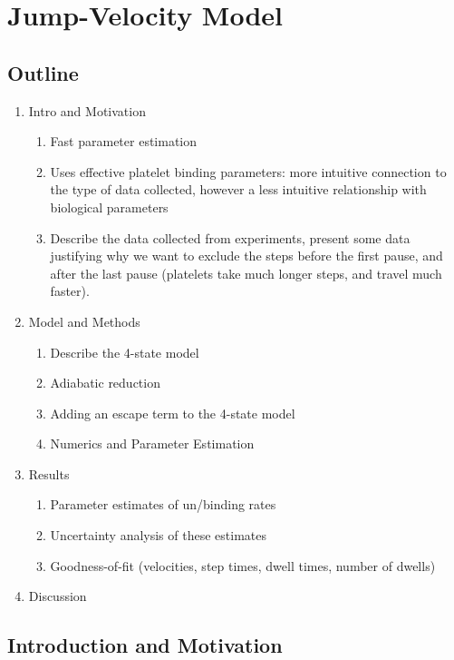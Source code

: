 
\chapter{Jump-Velocity Model}
\label{cha:jump-velocity-model}

\setcounter{section}{-1}
\section{Outline}
\label{sec:outline}

\begin{enumerate}
\item Intro and Motivation
  \begin{enumerate}
  \item Fast parameter estimation
  \item Uses effective platelet binding parameters: more intuitive
    connection to the type of data collected, however a less intuitive
    relationship with biological parameters
  \item Describe the data collected from experiments, present some
    data justifying why we want to exclude the steps before the first
    pause, and after the last pause (platelets take much longer steps,
    and travel much faster).
  \end{enumerate}
\item Model and Methods
  \begin{enumerate}
  \item Describe the 4-state model
  \item Adiabatic reduction
  \item Adding an escape term to the 4-state model
  \item Numerics and Parameter Estimation
  \end{enumerate}
\item Results
  \begin{enumerate}
  \item Parameter estimates of un/binding rates
  \item Uncertainty analysis of these estimates
  \item Goodness-of-fit (velocities, step times, dwell times, number
    of dwells)
  \end{enumerate}
\item Discussion
\end{enumerate}

\section{Introduction and Motivation}
\label{sec:intr-motiv}


